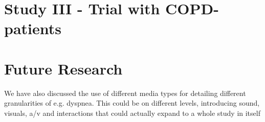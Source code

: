 \chapter{Study III - Trial with COPD-patients}

\chapter{Future Research}
We have also discussed the use of different media types for detailing different granularities of e.g. dyspnea. This could be on different levels, introducing sound, visuals, a/v and interactions that could actually expand to a whole study in itself

\label{lastpage}

\listoffixmes

